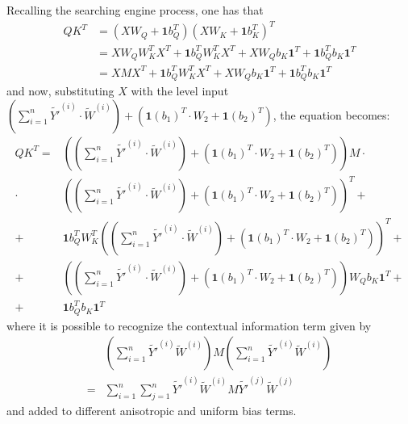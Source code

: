 \documentclass[11pt,a4paper,reqno]{amsart} %
\theoremstyle{definition}
\numberwithin{equation}{section}          %
\begin{document}
Recalling the searching engine process, one has that
\begin{equation}
\begin{aligned}
QK^T & =(X W_Q +\mathbf{1} b_Q^T)(X W_K + \mathbf{1} b_K^T)^T\\
&=X W_Q W_K^T X^T  + \mathbf{1}b_Q^T W_K^T X^T + X W_Q b_K \mathbf{1}^T+ \mathbf{1} b_Q^T b_K \mathbf{1}^T\\
&=X M X^T + \mathbf{1}b_Q^T W_K^T X^T + X W_Q b_K \mathbf{1}^T+ \mathbf{1} b_Q^T b_K \mathbf{1}^T
\end{aligned}
\end{equation}
and now, substituting $X$ with the level input $\left(\sum_{i=1}^n \widetilde{Y'}^{(i)} \cdot \widetilde{W}^{(i)} \right) +\left( \mathbf{1}(b_1)^T \cdot W_2 + \mathbf{1}(b_2)^T\right)$, the equation becomes:
\begin{equation}
\begin{aligned}
QK^T  =&\left( \left(\sum_{i=1}^n \widetilde{Y'}^{(i)} \cdot \widetilde{W}^{(i)} \right) +\left( \mathbf{1}(b_1)^T \cdot W_2 + \mathbf{1}(b_2)^T\right) \right) M \cdot \\
\cdot & \left( \left(\sum_{i=1}^n \widetilde{Y'}^{(i)} \cdot \widetilde{W}^{(i)} \right) +\left( \mathbf{1}(b_1)^T \cdot W_2 + \mathbf{1}(b_2)^T\right) \right)^T +
\\+& \mathbf{1}b_Q^T W_K^T \left( \left(\sum_{i=1}^n \widetilde{Y'}^{(i)} \cdot \widetilde{W}^{(i)} \right) +\left( \mathbf{1}(b_1)^T \cdot W_2 + \mathbf{1}(b_2)^T\right) \right)^T + \\
+& \left( \left(\sum_{i=1}^n \widetilde{Y'}^{(i)} \cdot \widetilde{W}^{(i)} \right) +\left( \mathbf{1}(b_1)^T \cdot W_2 + \mathbf{1}(b_2)^T\right) \right) W_Q b_K \mathbf{1}^T+\\
+& \mathbf{1} b_Q^T b_K \mathbf{1}^T
\end{aligned}
\end{equation}
where it is possible to recognize the contextual information term given by
\begin{equation}
\begin{aligned}
&\left(\sum_{i=1}^n \widetilde{Y'}^{(i)} \widetilde{W}^{(i)} \right) M \left(\sum_{i=1}^n \widetilde{Y'}^{(i)} \widetilde{W}^{(i)} \right)\\
=& \sum_{i=1}^n \sum_{j=1}^n  \widetilde{Y'}^{(i)} \widetilde{W}^{(i)}  M \widetilde{Y'}^{(j)} \widetilde{W}^{(j)} 
\end{aligned}
\end{equation}
and added to different anisotropic and uniform bias terms.
\end{document}
